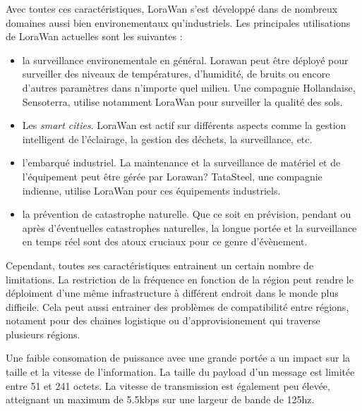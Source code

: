 \vspace{0.1cm}

Avec toutes ces caractéristiques, LoraWan s'est développé dans de nombreux domaines aussi bien environementaux qu'industriels. Les principales utilisations de LoraWan actuelles sont les suivantes :

\vspace{0.1cm}

\begin{itemize}

\item la surveillance environementale en général. Lorawan peut être déployé pour surveiller des niveaux de températures, d'humidité, de bruits ou encore d'autres paramètres dans n'importe quel milieu. Une compagnie Hollandaise, Sensoterra, utilise notamment LoraWan pour surveiller la qualité des sols.
\item Les \textit{smart cities}. LoraWan est actif sur différents aspects comme la gestion intelligent de l'éclairage, la gestion des déchets, la surveillance, etc.
\item l'embarqué industriel. La maintenance et la surveillance de matériel et de l'équipement peut être gérée par Lorawan? TataSteel, une compagnie indienne, utilise LoraWan pour ces équipements industriels.
\item la prévention de catastrophe naturelle. Que ce soit en prévision, pendant ou après d'éventuelles catastrophes naturelles, la longue portée et la surveillance en temps réel sont des atoux cruciaux pour ce genre d'évènement.
\end{itemize}

\vspace{0.1cm}

Cependant, toutes ses caractéristiques entrainent un certain nombre de limitations. La restriction de la fréquence en fonction de la région peut rendre le déploiment d'une même infrastructure à différent endroit dans le monde plus difficile. Cela peut aussi entrainer des problèmes de compatibilité entre régions, notament pour des chaines logistique ou d'approvisionement qui traverse plusieurs régions.

\vspace{0.1cm}

Une faible consomation de puissance avec une grande portée a un impact sur la taille et la vitesse de l'information. La taille du payload d'un message est limitée entre 51 et 241 octets. La vitesse de transmission est également peu élevée, atteignant un maximum de 5.5kbps sur une largeur de bande de 125hz.

